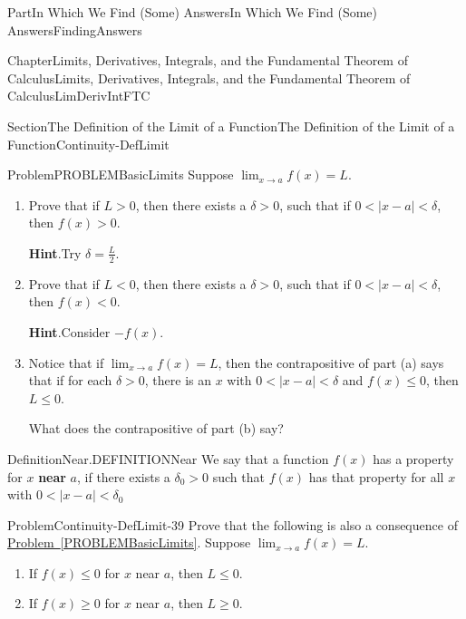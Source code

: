 \documentclass[oneside,10pt,]{book}
\newcommand{\blocktitlefont}{\relax}
\newcommand{\xreffont}{\relax}
\newcommand{\terminology}[1]{\textbf{#1}}
\numberwithin{equation}{part}
\def\limit#1#2#3{{\displaystyle\lim_{#1\rightarrow #2}#3}}
\newcommand{\lt}{<}
\newcommand{\gt}{>}
\begin{document}
\begin{partptx}{Part}{In Which We Find (Some) Answers}{}{In Which We Find (Some) Answers}{}{}{FindingAnswers}
\begin{chapterptx}{Chapter}{Limits, Derivatives, Integrals, and the Fundamental Theorem of Calculus}{}{Limits, Derivatives, Integrals, and the Fundamental Theorem of Calculus}{}{}{LimDerivIntFTC}
\begin{sectionptx}{Section}{The Definition of the Limit of a Function}{}{The Definition of the Limit of a Function}{}{}{Continuity-DefLimit}
\begin{problem}{Problem}{}{PROBLEMBasicLimits}%
Suppose \(\limit{x}{a}{ f(x)}=L\).%
\begin{enumerate}[font=\bfseries,label=(\alph*),ref=\alph*]%
\item{}Prove that if \(L\gt0\), then there exists a \(\delta >0\), such that if \(0\lt\left|x-a\right|\lt\delta \), then \(f\left(x\right)>0\).%
\par\smallskip%
\noindent\textbf{\blocktitlefont Hint}.\hypertarget{PROBLEMBasicLimits-2-2}{}\quad{}Try \(\delta =\frac{L}{2}\).%
\item{}Prove that if \(L\lt0\), then there exists a \(\delta >0\), such that if \(0\lt\left|x-a\right|\lt\delta\), then \(f\left(x\right)\lt0\).%
\par\smallskip%
\noindent\textbf{\blocktitlefont Hint}.\hypertarget{PROBLEMBasicLimits-3-2}{}\quad{}Consider \(-f(x)\).%
\item{}Notice that if \(\limit{x}{a}{f(x)}=L\), then the contrapositive of part (a) says that if for each \(\delta >0\), there is an \(x\) with \(0\lt\left|x-a\right|\lt\delta \) and \(f\left(x\right)\le
0\), then \(L\le 0\).%
\par
What does the contrapositive of part (b) say?%
\end{enumerate}%
\end{problem}
\begin{definition}{Definition}{Near.}{DEFINITIONNear}%
We say that a function \(f(x)\) has a property for \(x\) \terminology{near} \(a\), if there exists a \({\delta }_0>0\) such that \(f(x)\) has that property for all \(x\) with \(0\lt\left|x-a\right|\lt{\delta
}_0\)%
\end{definition}
\begin{problem}{Problem}{}{Continuity-DefLimit-39}%
Prove that the following is also a consequence of \hyperref[PROBLEMBasicLimits]{Problem~{\xreffont\ref{PROBLEMBasicLimits}}}.  Suppose \(\limit{x}{a}{f(x)}=L\).%
\begin{enumerate}[font=\bfseries,label=(\alph*),ref=\alph*]%
\item{}If \(f\left(x\right)\le 0\) for \(x\) near \(a\), then \(L\le 0\).%
\item{}If \(f\left(x\right)\ge 0\) for \(x\) near \(a\), then \(L\ge 0\).%
\end{enumerate}%
\end{problem}
\end{sectionptx}
%
%
\typeout{************************************************}

\end{chapterptx}
\end{partptx}
\end{document}
